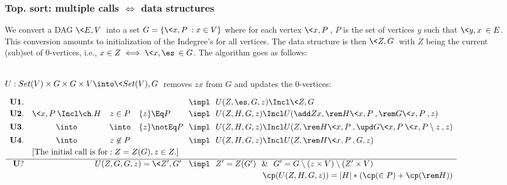 \documentclass[leqno]{article}
\begin{document}
\newpage
\subsubsection{Top. sort: multiple calls $\iff$ data structures}
We convert a DAG $\<E,V\>$ into a set $G=\{\<x,P\>:x\in V\}$ where for each 
vertex $\<x,P\>$,
$P$ is the set of vertices $y$ such that $\<y,x\>\in E$.
This conversion amounts to initialization of the Indegree's for all vertices. 
The data structure is then $\<Z,G\>$ with $Z$ being the current (sub)set of 
0-vertices, i.e., $x\in Z\iff \<x,\es\>\in G$. 
The algorithm goes  as follows:
\bit
{}
\eit

\bit
{}
 \\[-1ex]
\eit
$U:Set(V)\times G\times G\times V\into \<Set(V),G\>$ removes $zx$ from $G$ 
and updates the 0-vertices:

\noindent
$\begin{array}{rccl@{\ \ \impl\ \ }l}
{\bf U1.} &&& & {U(Z,\es,G,z)\Incl \<Z,G\>} \\[.5ex]
{\bf U2.} & \<x,P\>\Incl\ch.H & z\in P & \{z\}\Eq P  &  U(Z,H,G,z) \Incl
       U(\add Zx, \rem H{\<x,P\>},\rem G{\<x,P\>},z) \\[1ex]
{\bf U3.} & \into & \into & \{z\}\notEq P  & U(Z,H,G,z) \Incl 
       U(Z,\rem H{\<x,P\>}, \upd G{\<x,P\>}{\<x,P\setminus z\>},z) \\[1ex]
{\bf U4.} & \into  & z\not\in P & & U(Z,H,G,z)\Incl 
       U(Z,\rem H{\<x,P\>}, G, z) \\[.5ex]
&\multicolumn{4}{l}{[{\rm The\ initial\ call\ is\ for}: Z=Z(G), z\in Z.]} \\[.5ex] \hline
{\bf U?} &\multicolumn{3}{r@{\ \ \impl\ \ }}{U(Z,G,G,z)=\<Z',G'\>} & Z'=Z(G')\ \ 
     \&\ \ G'=G\setminus (z\times V)\setminus (Z'\times V) \\[.5ex]
  &\multicolumn{4}{r}{\cp(U(Z,H,G,z))=|H|*(\cp(\in P)+\cp(\rem H{}))} \\[-1ex] \ & \ 
\end{array}
$
\end{document}
